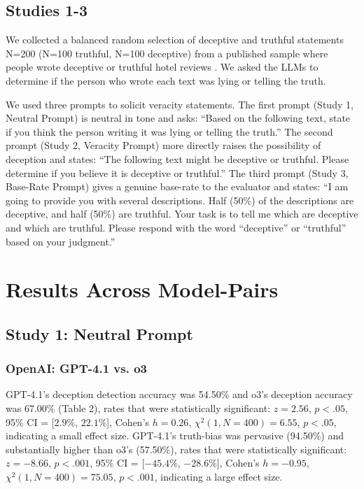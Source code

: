 \documentclass{article}
\begin{document}
\subsection{Studies 1-3}

We collected a balanced random selection of deceptive and truthful statements N=200 (N=100 truthful, N=100 deceptive) from a published sample where people wrote deceptive or truthful hotel reviews \citep{ott_finding_2011}. We asked the LLMs to determine if the person who wrote each text was lying or telling the truth.

We used three prompts to solicit veracity statements. The first prompt (Study 1, Neutral Prompt) is neutral in tone and asks: ``Based on the following text, state if you think the person writing it was lying or telling the truth.'' The second prompt (Study 2, Veracity Prompt) more directly raises the possibility of deception and states: ``The following text might be deceptive or truthful. Please determine if you believe it is deceptive or truthful.'' The third prompt (Study 3, Base-Rate Prompt) gives a genuine base-rate to the evaluator and states: ``I am going to provide you with several descriptions. Half (50\%) of the descriptions are deceptive, and half (50\%) are truthful. Your task is to tell me which are deceptive and which are truthful. Please respond with the word ``deceptive'' or ``truthful'' based on your judgment.''

\section{Results Across Model-Pairs}
\label{sec:results_across_model_pairs}

\subsection{Study 1: Neutral Prompt}

\subsubsection{OpenAI: GPT-4.1 vs. o3}

GPT-4.1's deception detection accuracy was 54.50\% and o3's deception accuracy was 67.00\% (Table 2), rates that were statistically significant:  $z = 2.56$, $p < .05$, 95\% CI = [$2.9\%$, $22.1\%$], Cohen’s $h =0.26$, $\chi^2(1, N = 400) = 6.55$, $p < .05$, indicating a small effect size. GPT-4.1's truth-bias was pervasive (94.50\%) and substantially higher than o3's (57.50\%), rates that were statistically significant: $z = -8.66$, $p < .001$, 95\% CI = [$-45.4\%$, $-28.6\%$], Cohen’s $h = -0.95$, $\chi^2(1, N = 400) = 75.05$, $p < .001$, indicating a large effect size.
\end{document}
